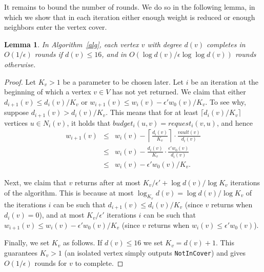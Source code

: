 \documentclass[11pt]{article}
\newtheorem{lemma}[theorem]{Lemma}
\newcommand{\Deal}{request}
\newcommand{\Vault}{vault}
\newcommand{\Budget}{budget}
\newcommand{\NotInCover}{\texttt{NotInCover}}
\newcommand{\ceil}[1]{\lceil #1 \rceil}
\begin{document}
It remains to bound the number of rounds. We do so in the following lemma, in which we show that in each iteration either enough weight is reduced or enough neighbors enter the vertex cover.
\begin{lemma}
\label{lemma:complexity}
In Algorithm~\ref{alg}, each vertex $v$ with degree $d(v)$ completes in $O(1/\epsilon)$ rounds if $d(v)\leq 16$, and in $O(\log{d(v)}/\epsilon\log\log{d(v)})$ rounds otherwise.
\end{lemma}
\begin{proof}
Let $K_v>1$ be a parameter to be chosen later. Let $i$ be an iteration at the beginning of which a vertex $v \in V$ has not yet returned. We claim that either
$d_{i+1}(v) \leq d_i(v)/K_v$ or $w_{i+1}(v) \leq w_i(v)-\epsilon'w_0(v)/K_v$. To see why, suppose $d_{i+1}(v) > d_i(v)/K_v$. This means that for at least $\ceil{d_i(v)/K_v}$ vertices $u \in N_i(v)$, it holds that $\Budget_i(u,v) = \Deal_i(v,u)$, and hence
\begin{eqnarray*}
w_{i+1}(v) &\leq& w_i(v) - \left\lceil\frac{d_i(v)}{K_v}\right\rceil\cdot\frac{\Vault(v)}{d_i(v)}\\
&\leq& w_i(v) - \frac{d_i(v)}{K_v}\cdot\frac{\epsilon' w_0(v)}{d_i(v)}\\
&\leq& w_i(v) - \epsilon' w_0(v)/K_v.
\end{eqnarray*}

Next, we claim that $v$ returns after at most $K_v/\epsilon' + \log{d(v)}/\log{K_v}$ iterations of the algorithm. This is because at most $\log_{K_v}{d(v)}=\log{d(v)}/\log{K_v}$ of the iterations $i$ can be such that $d_{i+1}(v) \leq d_i(v)/K_v$ (since $v$ returns when $d_i(v)=0$), and at most $K_v/\epsilon'$ iterations $i$ can be such that $w_{i+1}(v) \leq w_i(v)-\epsilon'w_0(v)/K_v$ (since $v$ returns when $w_i(v) \leq \epsilon'w_0(v)$).

Finally, we set $K_v$ as follows. If $d(v)\leq 16$ we set $K_v=d(v)+1$. This guarantees $K_v>1$ (an isolated vertex simply outputs \NotInCover) and gives $O(1/\epsilon)$ rounds for $v$ to complete.


\end{proof}
\end{document}
